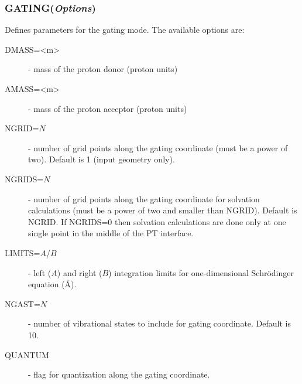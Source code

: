 \documentclass[oneside,11pt,openany]{book}
\newcommand{\tw}{\ttfamily}
\begin{document}
\subsubsection*{GATING({\it Options})}
%
Defines parameters for the gating mode. The available options are:
\begin{description}
\item[{\tw DMASS=<m>}] - mass of the proton donor (proton units)

\item[{\tw AMASS=<m>}] - mass of the proton acceptor (proton units)

\item[{\tw NGRID=$N$}] - number of grid points along the
gating coordinate (must be a power of two). Default is 1
(input geometry only).

\item[{\tw NGRIDS=$N$}] - number of grid points along the
gating coordinate for solvation calculations
(must be a power of two and smaller than NGRID). Default is NGRID.
If {\tw NGRIDS=0} then solvation calculations are done only at one
single point in the middle of the PT interface.

\item[{\tw LIMITS=$A$/$B$}] - left ($A$) and right ($B$) integration
limits for one-dimensional Schr\"odinger equation (\AA).

\item[{\tw NGAST=$N$}] - number of vibrational states to include
for gating coordinate. Default is 10.

\item[{\tw QUANTUM}] - flag for quantization along the gating coordinate.

\end{description}
\end{document}
